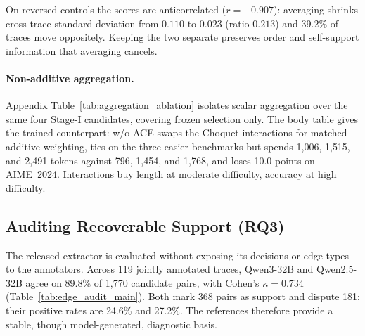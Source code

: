 On reversed controls the scores are anticorrelated ($r=-0.907$): averaging shrinks cross-trace standard deviation from $0.110$ to $0.023$ (ratio $0.213$) and 39.2\% of traces move oppositely. Keeping the two separate preserves order and self-support information that averaging cancels.

\paragraph{Non-additive aggregation.}
Appendix Table~\ref{tab:aggregation_ablation} isolates scalar aggregation over the same four Stage-I candidates, covering frozen selection only. The body table gives the trained counterpart: w/o ACE swaps the Choquet interactions for matched additive weighting, ties \method{} on the three easier benchmarks but spends 1{,}006, 1{,}515, and 2{,}491 tokens against 796, 1{,}454, and 1{,}768, and loses 10.0 points on AIME~2024. Interactions buy length at moderate difficulty, accuracy at high difficulty.

\subsection{Auditing Recoverable Support (RQ3)}
\label{sec:rq3}



The released extractor is evaluated without exposing its decisions or edge types to the annotators. Across 119 jointly annotated traces, Qwen3-32B and Qwen2.5-32B agree on 89.8\% of 1{,}770 candidate pairs, with Cohen's $\kappa=0.734$ (Table~\ref{tab:edge_audit_main}). Both mark 368 pairs as support and dispute 181; their positive rates are 24.6\% and 27.2\%. The references therefore provide a stable, though model-generated, diagnostic basis.

